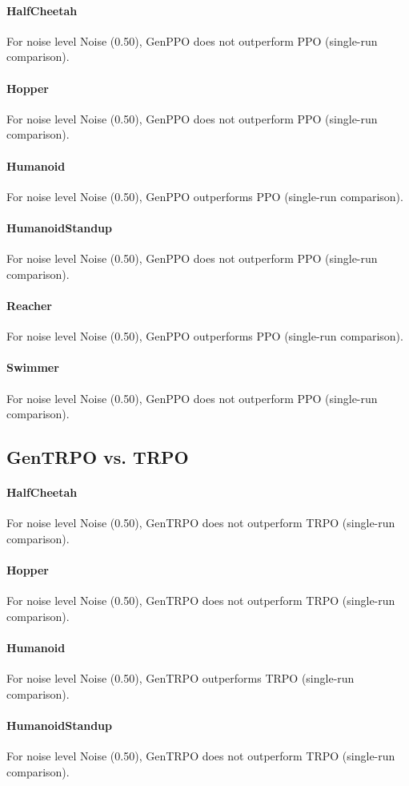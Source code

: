 \paragraph{HalfCheetah}
For noise level Noise (0.50), GenPPO does not outperform PPO (single-run comparison).
\paragraph{Hopper}
For noise level Noise (0.50), GenPPO does not outperform PPO (single-run comparison).
\paragraph{Humanoid}
For noise level Noise (0.50), GenPPO outperforms PPO (single-run comparison).
\paragraph{HumanoidStandup}
For noise level Noise (0.50), GenPPO does not outperform PPO (single-run comparison).
\paragraph{Reacher}
For noise level Noise (0.50), GenPPO outperforms PPO (single-run comparison).
\paragraph{Swimmer}
For noise level Noise (0.50), GenPPO does not outperform PPO (single-run comparison).
\subsection{GenTRPO vs. TRPO}
\paragraph{HalfCheetah}
For noise level Noise (0.50), GenTRPO does not outperform TRPO (single-run comparison).
\paragraph{Hopper}
For noise level Noise (0.50), GenTRPO does not outperform TRPO (single-run comparison).
\paragraph{Humanoid}
For noise level Noise (0.50), GenTRPO outperforms TRPO (single-run comparison).
\paragraph{HumanoidStandup}
For noise level Noise (0.50), GenTRPO does not outperform TRPO (single-run comparison).
